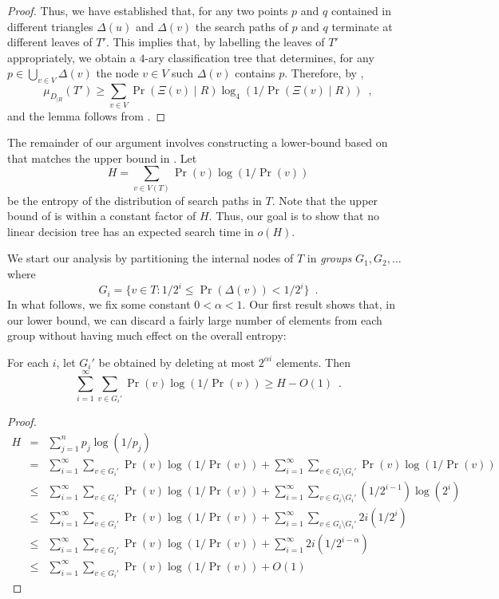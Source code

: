 \documentclass[charterfonts,lotsofwhite]{patmorin}
\begin{document}
\begin{proof}
Thus, we have established that, for any two points $p$ and $q$
contained in different triangles $\Delta(u)$ and $\Delta(v)$ the
search paths of $p$ and $q$ terminate at different leaves of $T'$.
This implies that, by labelling the leaves of $T'$ appropriately, we
obtain a $4$-ary classification tree that determines, for any
$p\in \bigcup_{v\in V} \Delta(v)$ the node $v\in V$ such
$\Delta(v)$ contains $p$.  Therefore, by ,
\[
     \mu_{D_{|R}} (T') 
	\ge \sum_{v\in V}\Pr(\Xi(v)\mid R)\log_4(1/\Pr(\Xi(v)\mid R)) \enspace ,
\]
and the lemma follows from .
\end{proof}

The remainder of our argument involves constructing a lower-bound
based on  that matches the upper bound in
.  Let 
\[
   H = \sum_{v\in V(T)} \Pr(v)\log (1/\Pr(v))
\] 
be the entropy of the distribution of search paths in $T$.  Note that
the upper bound of  is within a constant factor of
$H$. Thus, our goal is to show that no linear decision tree has an
expected search time in $o(H)$.

We start our analysis by partitioning the internal nodes of $T$ in
\emph{groups} $G_1,G_2,\ldots$ where
\[
	G_i = \{v\in T : 1/2^{i} \le \Pr(\Delta(v)) < 1/2^i \} \enspace .
\]
In what follows, we fix some constant $0< \alpha < 1$.  Our first
result shows that, in our lower bound, we can discard a fairly large
number of elements from each group without having much effect on the
overall entropy:

\begin{lem}
For each $i$, let $G_i'$ be obtained by deleting at most $2^{\alpha
i}$ elements.  Then
\[
    \sum_{i=1}^\infty \sum_{v\in G_i'} \Pr(v)\log(1/\Pr(v)) \ge H-O(1)
	\enspace .
\]
\end{lem}

\begin{proof}
\begin{eqnarray*}
   H & = & \sum_{j=1}^n p_j\log(1/p_j) \\
   & = & \sum_{i=1}^{\infty}\sum_{v\in G_i'} \Pr(v)\log (1/\Pr(v)) +
         \sum_{i=1}^{\infty}\sum_{v\in G_i\setminus G_i'} \Pr(v)\log (1/\Pr(v)) \\
   & \le & \sum_{i=1}^{\infty}\sum_{v\in G_i'} \Pr(v)\log (1/\Pr(v)) +
         \sum_{i=1}^{\infty}\sum_{v\in G_i\setminus G_i'} (1/2^{i-1})\log (2^i) \\
   & \le & \sum_{i=1}^{\infty}\sum_{v\in G_i'} \Pr(v)\log (1/\Pr(v)) +
         \sum_{i=1}^{\infty}\sum_{v\in G_i\setminus G_i'} 2i(1/2^{i}) \\
   & \le & \sum_{i=1}^{\infty}\sum_{v\in G_i'} \Pr(v)\log (1/\Pr(v)) +
         \sum_{i=1}^{\infty} 2i(1/2^{i-\alpha}) \\
   & \le & \sum_{i=1}^{\infty}\sum_{v\in G_i'} \Pr(v)\log (1/\Pr(v)) + O(1)
\end{eqnarray*}
\end{proof}
\end{document}
